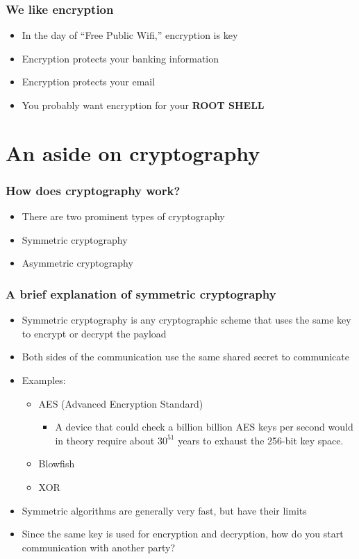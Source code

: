 \documentclass{beamer}
\begin{document}
\begin{frame}
  \frametitle{We like encryption}
  \begin{itemize}
    \item In the day of ``Free Public Wifi,'' encryption is key
    \item Encryption protects your banking information
    \item Encryption protects your email
    \item You probably want encryption for your {\bf ROOT SHELL}
  \end{itemize}
\end{frame}

\section{An aside on cryptography}

\begin{frame}
  \frametitle{How does cryptography work?}
  \begin{itemize}
    \item There are two prominent types of cryptography
    \item Symmetric cryptography
    \item Asymmetric cryptography
  \end{itemize}
\end{frame}

\begin{frame}
  \frametitle{A brief explanation of symmetric cryptography}
  \begin{itemize}
    \item Symmetric cryptography is any cryptographic scheme that uses the same key to encrypt or decrypt the payload
    \item Both sides of the communication use the same shared secret to communicate
    \item Examples:
      \begin{itemize}
	\item AES (Advanced Encryption Standard)
	  \begin{itemize}
	    \item A device that could check a billion billion AES keys per second would in theory require about $30^{51}$ years to exhaust the 256-bit key space.
	  \end{itemize}
	\item Blowfish
	\item XOR
    \end{itemize}
    \pause
  \item Symmetric algorithms are generally very fast, but have their limits
  \item Since the same key is used for encryption and decryption, how do you start communication with another party?
  \end{itemize}
\end{frame}
\end{document}
